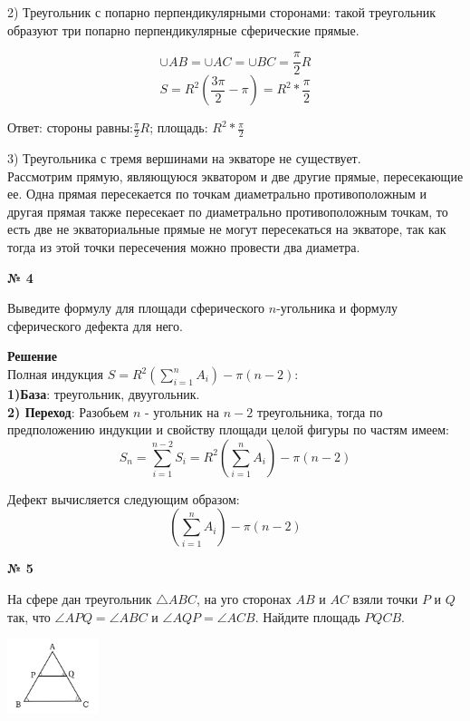     2) Треугольник с попарно перпендикулярными сторонами:
    такой треугольник образуют три попарно перпендикулярные сферические прямые.

    \[
        \cup AB = \cup AC = \cup BC = \frac{\pi}{2}R
    \]
    \[
        S = R^2\left(\frac{3\pi}{2} - \pi\right) = R^2 * \frac{\pi}{2}
    \]

    Ответ: стороны равны:$\frac{\pi}{2}R$; площадь: $R^2 * \frac{\pi}{2}$

    3) Треугольника с тремя вершинами на экваторе не существует.\\
    Рассмотрим прямую, являющуюся экватором и две другие прямые, пересекающие ее.
    Одна прямая пересекается по точкам диаметрально противоположным и другая прямая также
    пересекает по диаметрально противоположным точкам, то есть две не экваториальные прямые
    не могут пересекаться на экваторе, так как тогда из этой точки пересечения можно провести два диаметра.

    \begin{center}
        \textbf{№ 4}
    \end{center}

    Выведите формулу для площади сферического $n$-угольника и формулу сферического дефекта для него.

    \textbf{Решение}\\

    Полная индукция $S = R^2\left(\displaystyle\sum_{i=1}^n A_i\right) - \pi(n - 2)$:\\

    \textbf{1)База}: треугольник, двуугольник.\\

    \textbf{2) Переход}:
    Разобьем $n$ - угольник на $n - 2$ треугольника,
    тогда по предположению индукции и свойству площади целой фигуры по частям имеем:
    \[
        S_n = \displaystyle\sum_{i=1}^{n-2} S_i = R^2\left(\displaystyle\sum_{i=1}^n A_i\right) - \pi(n - 2)
    \]

    Дефект вычисляется следующим образом:
    \[
        \left(\displaystyle\sum_{i=1}^n A_i\right) - \pi(n - 2)
    \]

    \begin{center}
        \textbf{№ 5}
    \end{center}
    На сфере дан треугольник $\triangle ABC$, на уго сторонах $AB$ и $AC$ взяли
    точки $P$ и $Q$ так, что $\angle APQ = \angle ABC$ и $\angle AQP = \angle ACB$.
    Найдите площадь $PQCB$.
    \begin{center}
        \includegraphics[width=0.2\textwidth]{images/Frame 72@2x}\\
    \end{center}

